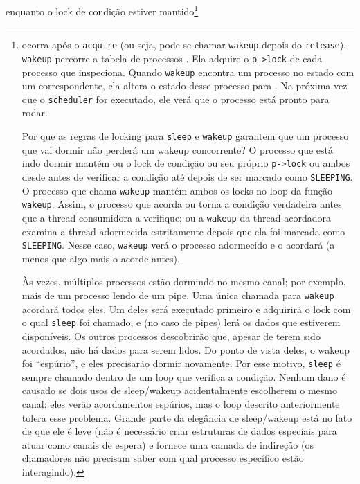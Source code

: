 enquanto o lock de condição estiver mantido\footnote{%
ocorra após o \lstinline{acquire}
(ou seja, pode-se chamar \lstinline{wakeup}
depois do \lstinline{release}).%
\lstinline{wakeup} percorre a tabela de processos
.
Ela adquire o \lstinline{p->lock}
de cada processo que inspeciona.
Quando \lstinline{wakeup} encontra um processo no estado
com um  correspondente,
ela altera o estado desse processo para
.
Na próxima vez que o \lstinline{scheduler} for executado,
ele verá que o processo está pronto para rodar.

Por que as regras de locking para
\lstinline{sleep}
e
\lstinline{wakeup}
garantem que um processo que vai dormir
não perderá um wakeup concorrente?
O processo que está indo dormir mantém
ou o lock de condição ou seu próprio
\lstinline{p->lock}
ou ambos desde antes de verificar a condição
até depois de ser marcado como \texttt{SLEEPING}.
O processo que chama \texttt{wakeup} mantém ambos os locks
no loop da função \texttt{wakeup}.
Assim, o processo que acorda ou
torna a condição verdadeira antes que a thread consumidora a verifique;
ou a \lstinline{wakeup} da thread acordadora examina a thread adormecida
estritamente depois que ela foi marcada como \texttt{SLEEPING}.
Nesse caso, \lstinline{wakeup} verá o processo adormecido
e o acordará (a menos que algo mais o acorde antes).

Às vezes, múltiplos processos estão dormindo
no mesmo canal; por exemplo, mais de um processo
lendo de um pipe.
Uma única chamada para
\lstinline{wakeup}
acordará todos eles.
Um deles será executado primeiro e adquirirá o lock com o qual
\lstinline{sleep} foi chamado, e (no caso de pipes) lerá os dados
que estiverem disponíveis.
Os outros processos descobrirão que, apesar de terem sido acordados,
não há dados para serem lidos.
Do ponto de vista deles, o wakeup foi “espúrio”, e
eles precisarão dormir novamente.
Por esse motivo, \lstinline{sleep} é sempre chamado dentro de um loop que
verifica a condição.
Nenhum dano é causado se dois usos de sleep/wakeup acidentalmente
escolherem o mesmo canal: eles verão acordamentos espúrios,
mas o loop descrito anteriormente tolera esse problema.
Grande parte da elegância de sleep/wakeup está no fato de que
ele é leve (não é necessário criar estruturas de dados especiais
para atuar como canais de espera) e fornece uma camada de indireção
(os chamadores não precisam saber com qual processo específico
estão interagindo).

}
